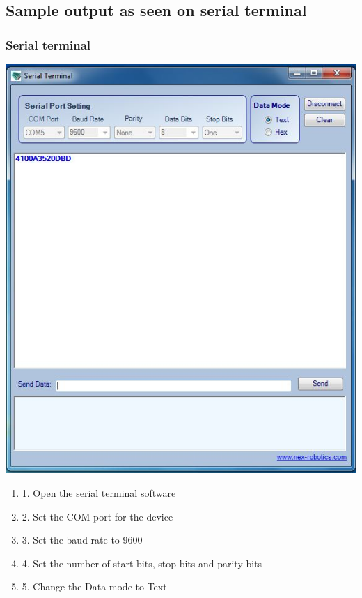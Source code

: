 \documentclass[table,10pt,red]{beamer}	%
\begin{document}
\subsection{Sample output as seen on serial terminal}
\begin{frame}
	\frametitle{Serial terminal}
	\begin{minipage}[c]{0.2\textwidth}
				\includegraphics[width=\linewidth]{st}
				
			\end{minipage}
			\hfill
			\begin{minipage}[c]{0.75\textwidth}
			\begin{enumerate}\small
			\item 1. Open the serial terminal software
			\item 2. Set the COM port for the device
			\item 3. Set the baud rate to 9600
			\item 4. Set the number of start bits, stop bits and parity bits
			\item 5. Change the Data mode to Text
			\end{enumerate}
			\end{minipage}
			

\end{frame}
\end{document}

